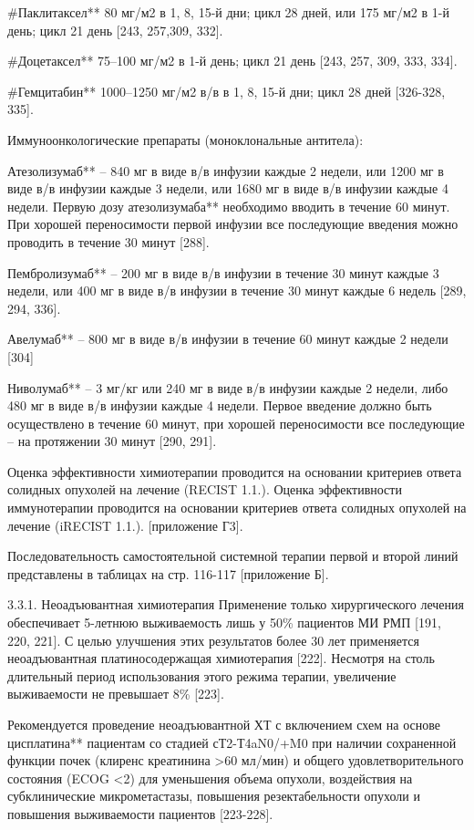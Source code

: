 #Паклитаксел** 80 мг/м2 в 1, 8, 15-й дни; цикл 28 дней, или 175  мг/м2 в 1-й день; цикл 21 день [243, 257,309, 332].

#Доцетаксел** 75–100 мг/м2 в 1-й день; цикл 21 день [243, 257, 309, 333, 334].

#Гемцитабин** 1000–1250 мг/м2 в/в в 1, 8, 15-й дни; цикл 28 дней  [326-328, 335].

Иммуноонкологические препараты (моноклональные антитела):  

Атезолизумаб** – 840 мг в виде в/в инфузии каждые 2 недели, или 1200 мг в виде в/в инфузии каждые 3 недели, или 1680 мг в виде в/в инфузии каждые 4 недели. Первую дозу атезолизумаба** необходимо вводить в течение 60 минут. При хорошей переносимости первой инфузии все последующие введения можно проводить в течение 30 минут [288].   

Пембролизумаб** – 200 мг в виде в/в инфузии в течение 30 минут каждые 3 недели, или 400 мг в виде в/в инфузии в течение 30 минут каждые 6 недель [289, 294, 336].

Авелумаб** – 800 мг в виде в/в инфузии в течение 60 минут каждые 2 недели [304]

Ниволумаб** – 3 мг/кг или 240 мг в виде в/в инфузии каждые 2 недели, либо 480 мг в виде в/в инфузии каждые 4 недели. Первое введение должно быть осуществлено в течение 60 минут, при хорошей переносимости все последующие – на протяжении 30 минут [290, 291].

Оценка эффективности химиотерапии проводится на основании критериев ответа солидных опухолей на лечение (RECIST 1.1.). Оценка эффективности иммунотерапии проводится на основании критериев ответа солидных опухолей на лечение (iRECIST 1.1.). [приложение Г3].

Последовательность самостоятельной системной терапии первой и второй линий представлены в таблицах на стр. 116-117 [приложение Б].

3.3.1. Неоадъювантная химиотерапия
Применение только хирургического лечения обеспечивает 5-летнюю выживаемость лишь у 50\% пациентов МИ РМП [191, 220, 221]. С целью улучшения этих результатов более 30 лет применяется неоадъювантная платиносодержащая химиотерапия [222]. Несмотря на столь длительный период использования этого режима терапии, увеличение выживаемости не превышает 8\% [223].

Рекомендуется проведение неоадъювантной ХТ с включением схем на основе цисплатина** пациентам со стадией сТ2-Т4aN0/+M0 при наличии сохраненной функции почек (клиренс креатинина >60 мл/мин) и общего удовлетворительного состояния (ECOG <2) для уменьшения объема опухоли, воздействия на субклинические микрометастазы, повышения резектабельности опухоли и повышения выживаемости пациентов [223-228].

